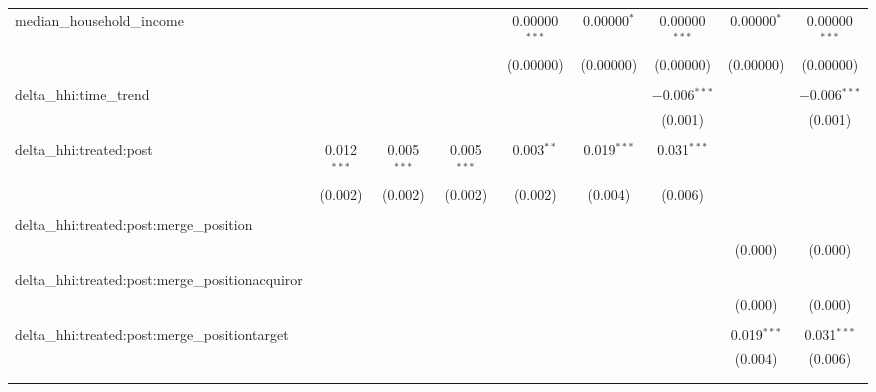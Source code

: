 \begin{table}[H]
{\begin{tabular}{@{\extracolsep{5pt}}lcccccccc}
  median\_household\_income &  &  &  & 0.00000$^{***}$ & 0.00000$^{*}$ & 0.00000$^{***}$ & 0.00000$^{*}$ & 0.00000$^{***}$ \\  

   &  &  &  & (0.00000) & (0.00000) & (0.00000) & (0.00000) & (0.00000) \\  

   & & & & & & & & \\  

  delta\_hhi:time\_trend &  &  &  &  &  & $-$0.006$^{***}$ &  & $-$0.006$^{***}$ \\  

   &  &  &  &  &  & (0.001) &  & (0.001) \\  

   & & & & & & & & \\  

  delta\_hhi:treated:post & 0.012$^{***}$ & 0.005$^{***}$ & 0.005$^{***}$ & 0.003$^{**}$ & 0.019$^{***}$ & 0.031$^{***}$ &  &  \\  

   & (0.002) & (0.002) & (0.002) & (0.002) & (0.004) & (0.006) &  &  \\  

   & & & & & & & & \\  

  delta\_hhi:treated:post:merge\_position &  &  &  &  &  &  &  &  \\  

   &  &  &  &  &  &  & (0.000) & (0.000) \\  

   & & & & & & & & \\  

  delta\_hhi:treated:post:merge\_positionacquiror &  &  &  &  &  &  &  &  \\  

   &  &  &  &  &  &  & (0.000) & (0.000) \\  

   & & & & & & & & \\  

  delta\_hhi:treated:post:merge\_positiontarget &  &  &  &  &  &  & 0.019$^{***}$ & 0.031$^{***}$ \\  

   &  &  &  &  &  &  & (0.004) & (0.006) \\  

   & & & & & & & & \\  

 \hline \\[-1.8ex]  


\end{tabular}}
\end{table}
